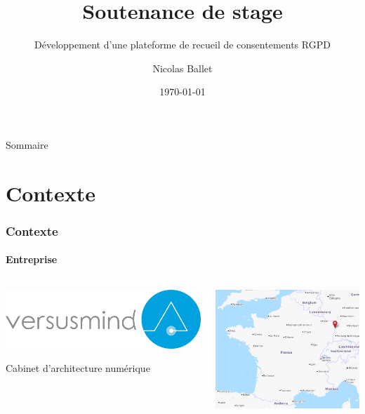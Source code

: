 \documentclass[aspectratio=169]{beamer}
\title[Développement d’une plateforme de recueil de consentements RGPD]{Soutenance de stage}
\subtitle{Développement d’une plateforme de recueil de consentements RGPD}
\author{Nicolas Ballet}
\institute[UTBM]{Université de Technologie de Belfort Montbéliard}
\date[\the\year-\twodigits\month-\twodigits\day]{\today}
\begin{document}
\begin{frame}
    \titlepage{}
\end{frame}
\begin{frame}{Sommaire}
    \tableofcontents
\end{frame}

\section{Contexte}
\begin{frame}
    \frametitle{Contexte}
    \framesubtitle{Entreprise}
    \begin{columns}
        \hfill
        \begin{column}{0.45\textwidth}
            \begin{center}
                \hfill\includegraphics[width=1.0\textwidth]{versusmind.png}
            \end{center}
            \hfill \color{gray} Cabinet d'architecture numérique   
        \end{column}
        \begin{column}{0.5\textwidth}
            \begin{center}
                \includegraphics[width=1.0\textwidth]{strasbourg.png}
            \end{center}
        \end{column}
    \end{columns}
\end{frame}
\end{document}
